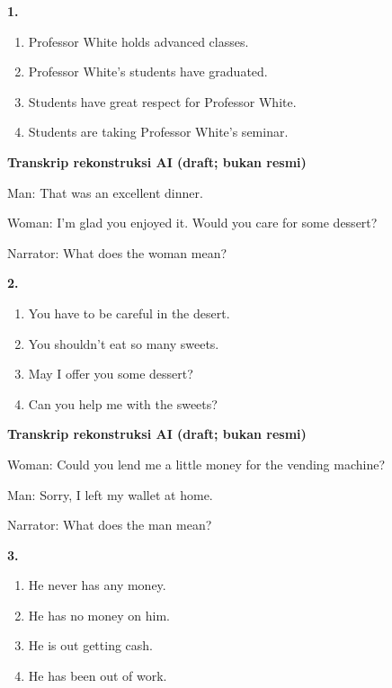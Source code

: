 \documentclass[12pt]{article}
\begin{document}
\noindent\textbf{1.}
\begin{enumerate}[label=(\Alph*),leftmargin=*,itemsep=0.2em]
\item Professor White holds advanced classes.
\item Professor White's students have graduated.
\item Students have great respect for Professor White.
\item Students are taking Professor White's seminar.
\end{enumerate}
\par
\vspace{0.25\baselineskip}
\begin{exampleblock}
\textbf{Transkrip rekonstruksi AI (draft; bukan resmi)}\par
Man: That was an excellent dinner.\par
Woman: I'm glad you enjoyed it. Would you care for some dessert?\par
Narrator: What does the woman mean?\par
\end{exampleblock}
\noindent\textbf{2.}
\begin{enumerate}[label=(\Alph*),leftmargin=*,itemsep=0.2em]
\item You have to be careful in the desert.
\item You shouldn't eat so many sweets.
\item May I offer you some dessert?
\item Can you help me with the sweets?
\end{enumerate}
\par
\vspace{0.25\baselineskip}
\begin{exampleblock}
\textbf{Transkrip rekonstruksi AI (draft; bukan resmi)}\par
Woman: Could you lend me a little money for the vending machine?\par
Man: Sorry, I left my wallet at home.\par
Narrator: What does the man mean?\par
\end{exampleblock}
\noindent\textbf{3.}
\begin{enumerate}[label=(\Alph*),leftmargin=*,itemsep=0.2em]
\item He never has any money.
\item He has no money on him.
\item He is out getting cash.
\item He has been out of work.
\end{enumerate}
\end{document}
